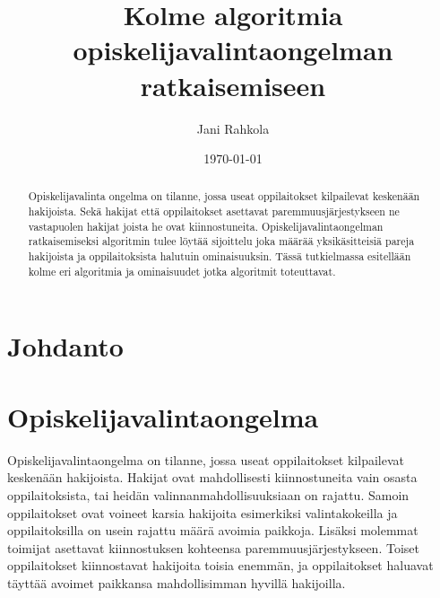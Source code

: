 \documentclass[gradu, twoside]{tktltiki}
\begin{document}
\title{Kolme algoritmia opiskelijavalintaongelman ratkaisemiseen}
\author{Jani Rahkola}
\date{\today}
\numberofpagesinformation{}



\maketitle

\doublespacing

\subject{Tietojenkäsittelytiede}

\begin{abstract}
Opiskelijavalinta ongelma on tilanne, jossa useat oppilaitokset
kilpailevat keskenään hakijoista. Sekä hakijat että oppilaitokset
asettavat paremmuusjärjestykseen ne vastapuolen hakijat joista he ovat
kiinnostuneita. Opiskelijavalintaongelman ratkaisemiseksi algoritmin
tulee löytää sijoittelu joka määrää yksikäsitteisiä pareja hakijoista
ja oppilaitoksista halutuin ominaisuuksin. Tässä tutkielmassa
esitellään kolme eri algoritmia ja ominaisuudet jotka algoritmit
toteuttavat.
\end{abstract}

\mytableofcontents

\section{Johdanto}

\section{Opiskelijavalintaongelma}

Opiskelijavalintaongelma on tilanne, jossa useat oppilaitokset
kilpailevat keskenään hakijoista. Hakijat ovat mahdollisesti
kiinnostuneita vain osasta oppilaitoksista, tai heidän
valinnanmahdollisuuksiaan on rajattu. Samoin oppilaitokset ovat
voineet karsia hakijoita esimerkiksi valintakokeilla ja
oppilaitoksilla on usein rajattu määrä avoimia paikkoja. Lisäksi
molemmat toimijat asettavat kiinnostuksen kohteensa
paremmuusjärjestykseen. Toiset oppilaitokset kiinnostavat hakijoita
toisia enemmän, ja oppilaitokset haluavat täyttää avoimet paikkansa
mahdollisimman hyvillä hakijoilla.
\end{document}
